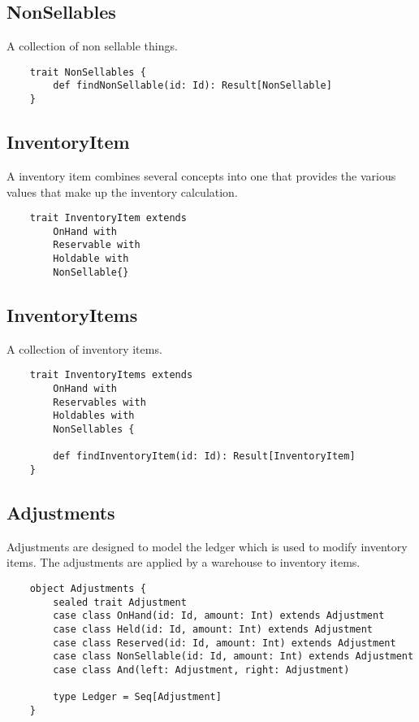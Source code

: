\documentclass[11pt]{article}
\begin{document}
\subsection{NonSellables}

A collection of non sellable things. 

\begin{lstlisting}
    trait NonSellables {
        def findNonSellable(id: Id): Result[NonSellable]
    }
\end{lstlisting}

\subsection{InventoryItem}

A inventory item combines several concepts into one that provides the various values that
make up the inventory calculation.

\begin{lstlisting}
    trait InventoryItem extends 
        OnHand with 
        Reservable with
        Holdable with
        NonSellable{}
\end{lstlisting}

\subsection{InventoryItems}

A collection of inventory items.

\begin{lstlisting}
    trait InventoryItems extends
        OnHand with
        Reservables with
        Holdables with
        NonSellables {

        def findInventoryItem(id: Id): Result[InventoryItem]
    }
\end{lstlisting}

\subsection{Adjustments}

Adjustments are designed to model the ledger which is used to modify inventory items.
The adjustments are applied by a warehouse to inventory items.

\begin{lstlisting}
    object Adjustments {
        sealed trait Adjustment
        case class OnHand(id: Id, amount: Int) extends Adjustment
        case class Held(id: Id, amount: Int) extends Adjustment
        case class Reserved(id: Id, amount: Int) extends Adjustment
        case class NonSellable(id: Id, amount: Int) extends Adjustment
        case class And(left: Adjustment, right: Adjustment)

        type Ledger = Seq[Adjustment]
    }
\end{lstlisting}
\end{document}
